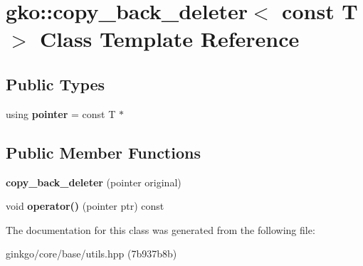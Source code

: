 \hypertarget{classgko_1_1copy__back__deleter_3_01const_01T_01_4}{}\section{gko\+:\+:copy\+\_\+back\+\_\+deleter$<$ const T $>$ Class Template Reference}
\label{classgko_1_1copy__back__deleter_3_01const_01T_01_4}
\subsection*{Public Types}
\begin{DoxyCompactItemize}
\item 
\mbox{\label{classgko_1_1copy__back__deleter_3_01const_01T_01_4_ac97aced5ec2b913d1b2ed864852c7e7a}} 
using {\bfseries pointer} = const T $\ast$
\end{DoxyCompactItemize}
\subsection*{Public Member Functions}
\begin{DoxyCompactItemize}
\item 
\mbox{\label{classgko_1_1copy__back__deleter_3_01const_01T_01_4_a5df23aa81eb300213916238b9bf93507}} 
{\bfseries copy\+\_\+back\+\_\+deleter} (pointer original)
\item 
\mbox{\label{classgko_1_1copy__back__deleter_3_01const_01T_01_4_a040c2d22121f60c491e3b6e65f399248}} 
void {\bfseries operator()} (pointer ptr) const
\end{DoxyCompactItemize}


The documentation for this class was generated from the following file\+:\begin{DoxyCompactItemize}
\item 
ginkgo/core/base/utils.\+hpp (7b937b8b)\end{DoxyCompactItemize}
